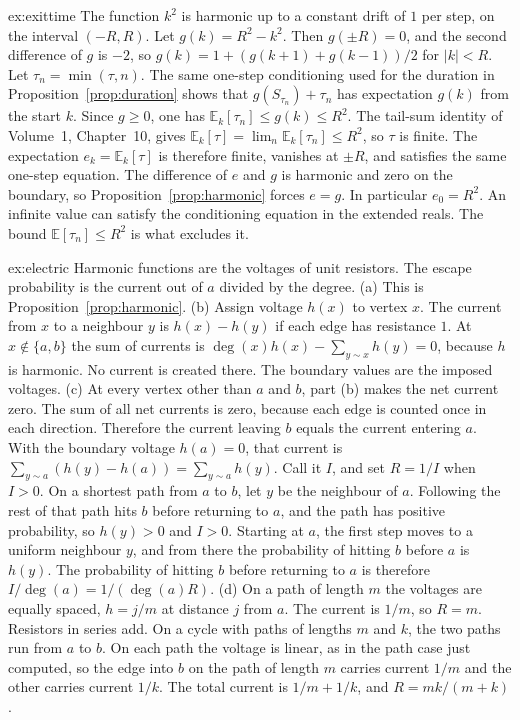 \begin{solution}{ex:exittime}
\idea The function $k^2$ is harmonic up to a constant drift of $1$ per step, on the interval $(-R,R)$.
\writeup Let $g(k)=R^2-k^2$. Then $g(\pm R)=0$, and the second difference of $g$ is $-2$, so $g(k)=1+(g(k+1)+g(k-1))/2$ for $|k|<R$. Let $\tau_n=\min(\tau,n)$. The same one-step conditioning used for the duration in Proposition~\ref{prop:duration} shows that $g(S_{\tau_n})+\tau_n$ has expectation $g(k)$ from the start $k$. Since $g\ge0$, one has $\mathbb E_k[\tau_n]\le g(k)\le R^2$. The tail-sum identity of Volume~1, Chapter~10, gives $\mathbb E_k[\tau]=\lim_n\mathbb E_k[\tau_n]\le R^2$, so $\tau$ is finite. The expectation $e_k=\mathbb E_k[\tau]$ is therefore finite, vanishes at $\pm R$, and satisfies the same one-step equation. The difference of $e$ and $g$ is harmonic and zero on the boundary, so Proposition~\ref{prop:harmonic} forces $e=g$. In particular $e_0=R^2$. An infinite value can satisfy the conditioning equation in the extended reals. The bound $\mathbb E[\tau_n]\le R^2$ is what excludes it.
\end{solution}

\begin{solution}{ex:electric}
\idea Harmonic functions are the voltages of unit resistors. The escape probability is the current out of $a$ divided by the degree.
\writeup (a) This is Proposition~\ref{prop:harmonic}.
(b) Assign voltage $h(x)$ to vertex $x$. The current from $x$ to a neighbour $y$ is $h(x)-h(y)$ if each edge has resistance $1$. At $x\notin\{a,b\}$ the sum of currents is $\deg(x)h(x)-\sum_{y\sim x}h(y)=0$, because $h$ is harmonic. No current is created there. The boundary values are the imposed voltages.
(c) At every vertex other than $a$ and $b$, part (b) makes the net current zero. The sum of all net currents is zero, because each edge is counted once in each direction. Therefore the current leaving $b$ equals the current entering $a$. With the boundary voltage $h(a)=0$, that current is $\sum_{y\sim a}(h(y)-h(a))=\sum_{y\sim a}h(y)$. Call it $I$, and set $R=1/I$ when $I>0$. On a shortest path from $a$ to $b$, let $y$ be the neighbour of $a$. Following the rest of that path hits $b$ before returning to $a$, and the path has positive probability, so $h(y)>0$ and $I>0$. Starting at $a$, the first step moves to a uniform neighbour $y$, and from there the probability of hitting $b$ before $a$ is $h(y)$. The probability of hitting $b$ before returning to $a$ is therefore $I/\deg(a)=1/(\deg(a)R)$.
(d) On a path of length $m$ the voltages are equally spaced, $h=j/m$ at distance $j$ from $a$. The current is $1/m$, so $R=m$. Resistors in series add. On a cycle with paths of lengths $m$ and $k$, the two paths run from $a$ to $b$. On each path the voltage is linear, as in the path case just computed, so the edge into $b$ on the path of length $m$ carries current $1/m$ and the other carries current $1/k$. The total current is $1/m+1/k$, and $R=mk/(m+k)$.
\end{solution}

